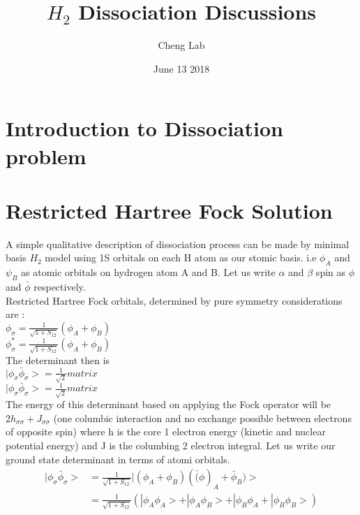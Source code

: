 \documentclass[11pt]{article}   	%
\begin{document}
\title{$H_2$ Dissociation Discussions}
\author{Cheng Lab}
\date{June 13 2018}							%
\maketitle
\section{Introduction to Dissociation problem}
\section{Restricted Hartree Fock Solution}
	A simple qualitative description of dissociation process can be made by minimal basis $H_2$ model using 1S orbitals on each H atom as our stomic basis.
	i.e $\phi_A$ and $\psi_B$ as atomic orbitals on hydrogen atom A and B. Let us write $\alpha$ and $\beta$ spin as $\phi$ and $\bar{\phi}$ respectively. \\
	Restricted Hartree Fock orbitals, determined by pure symmetry considerations are :\\ 
	$\phi_{\sigma}=\frac{1}{\sqrt{1+S_{12}}}(\phi_A+\phi_B)$\\	
	$\phi_{\sigma}^*=\frac{1}{\sqrt{1+S_{12}}}(\phi_A+\phi_B)$\\
	The determinant then is\\
	$|\phi_{\sigma}\bar{\phi}_{\sigma}>=\frac{1}{\sqrt{2}}matrix$\\
	$|\phi_{\sigma}\bar{\phi}_{\sigma}>=\frac{1}{\sqrt{2}}matrix$\\
	The energy of this determinant based on applying the Fock operator will be $2h_{\sigma \sigma} + J_{\sigma \sigma}$ (one columbic interaction 
	and no exchange possible between electrons of opposite spin) where h is the core 1 electron energy (kinetic and nuclear potential energy)
	and J is the columbing 2 electron integral. Let us write our ground state determinant in terms of atomi orbitals.\\
	\begin{equation}
	\begin{split}
		|\phi_{\sigma}\bar{\phi}_{\sigma}> &=\frac{1}{\sqrt{1+S_{12}}}|(\phi_A+\phi_B)(\bar(\phi)_A+\bar{\phi}_B)>\\
					  &=\frac{1}{\sqrt{1+S_{12}}}(|\phi_A \phi_A>+|\phi_A \phi_B>+|\phi_B \phi_A+|\phi_B \phi_B>)\\
	\end{split}
	\end{equation}
\end{document}
